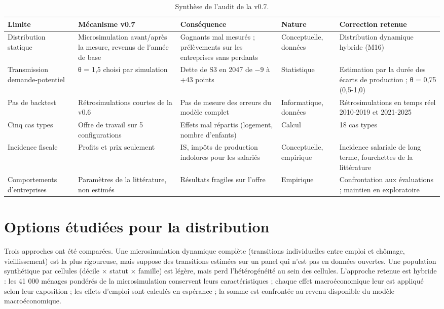 \begin{table}[htbp]\centering\scriptsize
\caption{Synthèse de l'audit de la v0.7.}\label{tab:audit}
\begin{tabularx}{\linewidth}{@{}p{3.2cm}LLl L@{}}\toprule
Limite & Mécanisme v0.7 & Conséquence & Nature & Correction retenue\\ \midrule
Distribution statique & Microsimulation avant/après la mesure, revenus de l'année de base & Gagnants mal mesurés ; prélèvements sur les entreprises sans perdants & Conceptuelle, données & Distribution dynamique hybride (M16)\\
Transmission demande-potentiel & θ = 1,5 choisi par simulation & Dette de S3 en 2047 de $-9$ à +43 points & Statistique & Estimation par la durée des écarts de production ; θ = 0,75 (0,5-1,0)\\
Pas de backtest & Rétrosimulations courtes de la v0.6 & Pas de mesure des erreurs du modèle complet & Informatique, données & Rétrosimulations en temps réel 2010-2019 et 2021-2025\\
Cinq cas types & Offre de travail sur 5 configurations & Effets mal répartis (logement, nombre d'enfants) & Calcul & 18 cas types\\
Incidence fiscale & Profits et prix seulement & IS, impôts de production indolores pour les salariés & Conceptuelle, empirique & Incidence salariale de long terme, fourchettes de la littérature\\
Comportements d'entreprises & Paramètres de la littérature, non estimés & Résultats fragiles sur l'offre & Empirique & Confrontation aux évaluations ; maintien en exploratoire\\ \bottomrule
\end{tabularx}
\end{table}

\section{Options étudiées pour la distribution}

Trois approches ont été comparées. Une microsimulation dynamique complète (transitions individuelles entre emploi et
chômage, vieillissement) est la plus rigoureuse, mais suppose des transitions estimées sur un panel qui n'est pas en
données ouvertes. Une population synthétique par cellules (décile × statut × famille) est légère, mais perd
l'hétérogénéité au sein des cellules. L'approche retenue est hybride : les 41 000 ménages pondérés de la
microsimulation conservent leurs caractéristiques ; chaque effet macroéconomique leur est appliqué selon leur
exposition ; les effets d'emploi sont calculés en espérance ; la somme est confrontée au revenu disponible du modèle
macroéconomique.

